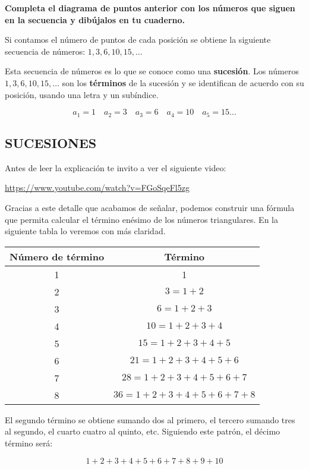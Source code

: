 \documentclass[12pt,a4paper]{article}
\begin{document}
\textbf{Completa el diagrama de puntos anterior con los números que siguen en la secuencia y dibújalos en tu cuaderno.}

Si contamos el número de puntos de cada posición se obtiene la siguiente secuencia de números: $1, 3, 6, 10, 15, \ldots$

Esta secuencia de números es lo que se conoce como una \textbf{sucesión}. Los números $1, 3, 6, 10, 15, \ldots$ son los \textbf{términos} de la sucesión y se identifican de acuerdo con su posición, usando una letra y un subíndice.

\[ a_1 = 1 \quad a_2 = 3 \quad a_3 = 6 \quad a_4 = 10 \quad a_5 = 15 \ldots \]

\subsection*{SUCESIONES}

Antes de leer la explicación te invito a ver el siguiente video:

\url{https://www.youtube.com/watch?v=FGoSqeFl5zg}

Gracias a este detalle que acabamos de señalar, podemos construir una fórmula que permita calcular el término enésimo de los números triangulares. En la siguiente tabla lo veremos con más claridad.

\begin{center}
\begin{tabular}{|c|c|}
\hline
\textbf{Número de término} & \textbf{Término} \\
\hline
1 & 1 \\
2 & $3 = 1 + 2$ \\
3 & $6 = 1 + 2 + 3$ \\
4 & $10 = 1 + 2 + 3 + 4$ \\
5 & $15 = 1 + 2 + 3 + 4 + 5$ \\
6 & $21 = 1 + 2 + 3 + 4 + 5 + 6$ \\
7 & $28 = 1 + 2 + 3 + 4 + 5 + 6 + 7$ \\
8 & $36 = 1 + 2 + 3 + 4 + 5 + 6 + 7 + 8$ \\
\hline
\end{tabular}
\end{center}

El segundo término se obtiene sumando dos al primero, el tercero sumando tres al segundo, el cuarto cuatro al quinto, etc. Siguiendo este patrón, el décimo término será:

\[ 1 + 2 + 3 + 4 + 5 + 6 + 7 + 8 + 9 + 10 \]
\end{document}
